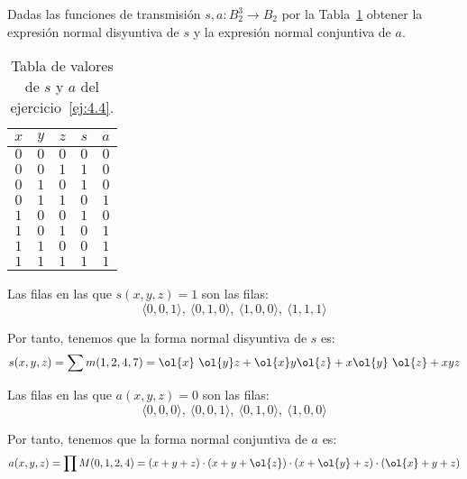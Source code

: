 \begin{ejercicio} \label{ej:4.4}
    Dadas las funciones de transmisión $s,a:B_2^3\to B_2$ por la Tabla~\ref{tab:4.4} obtener la expresión normal disyuntiva de $s$
    y la expresión normal conjuntiva de $a$.
    \begin{table}[H]
        \centering
        \begin{tabular}{ccc|cc}
            $x$ & $y$ & $z$ & $s$ & $a$\\
            \hline
            $0$ & $0$ & $0$ & $0$ & $0$\\
            $0$ & $0$ & $1$ & $1$ & $0$\\
            $0$ & $1$ & $0$ & $1$ & $0$\\
            $0$ & $1$ & $1$ & $0$ & $1$\\
            $1$ & $0$ & $0$ & $1$ & $0$\\
            $1$ & $0$ & $1$ & $0$ & $1$\\
            $1$ & $1$ & $0$ & $0$ & $1$\\
            $1$ & $1$ & $1$ & $1$ & $1$
        \end{tabular}
        \caption{Tabla de valores de $s$ y $a$ del ejercicio~\ref{ej:4.4}.}
        \label{tab:4.4}
    \end{table}

    Las filas en las que $s(x,y,z)=1$ son las filas:
    \begin{equation*}
        \langle 0,0,1\rangle,~\langle 0,1,0\rangle,~\langle 1,0,0\rangle,~\langle 1,1,1\rangle
    \end{equation*}

    Por tanto, tenemos que la forma normal disyuntiva de $s$ es:
    \begin{equation*}
        s(x,y,z)
        = \sum m(1,2,4,7)
        = \ol{x}~\ol{y}z + \ol{x}y\ol{z} + x\ol{y}~\ol{z} + xyz
    \end{equation*}

    Las filas en las que $a(x,y,z)=0$ son las filas:
    \begin{equation*}
        \langle 0,0,0\rangle,~\langle 0,0,1\rangle,~\langle 0,1,0\rangle,~\langle 1,0,0\rangle
    \end{equation*}

    Por tanto, tenemos que la forma normal conjuntiva de $a$ es:
    \begin{equation*}
        a(x,y,z)
        = \prod M(0,1,2,4)
        = (x+y+z)\cdot (x+y+\ol{z})\cdot (x+\ol{y}+z)\cdot (\ol{x}+y+z)
    \end{equation*}
\end{ejercicio}



